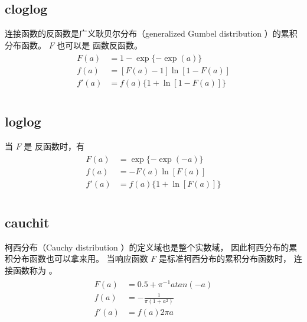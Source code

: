\documentclass[letterpaper,10pt,english]{sphinxmanual}
\begin{document}
\subsection{clog\sphinxhyphen{}log}
\label{\detokenize{_u6709_u5e8f_u79bb_u6563_u6a21_u578b/content:clog-log}}
 连接函数的反函数是广义耿贝尔分布（generalized Gumbel distribution ）的累积分布函数。
\(F\) 也可以是  函数反函数。
\begin{align}\label{equation:有序离散模型/content:有序离散模型/content:15}\!\begin{aligned}
F(a) &= 1 - \exp\{ -\exp(a) \}\\
f(a) &= [ F(a)-1] \ln [ 1- F(a)]\\
f'(a) &= f(a) \{ 1+\ln[1-F(a) ] \}\\
\end{aligned}\end{align}

\subsection{log\sphinxhyphen{}log}
\label{\detokenize{_u6709_u5e8f_u79bb_u6563_u6a21_u578b/content:log-log}}
当 \(F\) 是  反函数时，有
\begin{align}\label{equation:有序离散模型/content:有序离散模型/content:16}\!\begin{aligned}
F(a) &= \exp\{ -\exp(-a) \}\\
f(a) &= - F(a) \ln [ F(a)]\\
f'(a) &= f(a) \{ 1+\ln[F(a) ] \}\\
\end{aligned}\end{align}

\subsection{cauchit}
\label{\detokenize{_u6709_u5e8f_u79bb_u6563_u6a21_u578b/content:cauchit}}
柯西分布（Cauchy distribution ）的定义域也是整个实数域，
因此柯西分布的累积分布函数也可以拿来用。
当响应函数 \(F\) 是标准柯西分布的累积分布函数时，
连接函数称为 
。
\begin{align}\label{equation:有序离散模型/content:有序离散模型/content:17}\!\begin{aligned}
F(a) &=  0.5 + \pi^{-1} atan(-a)\\
f(a) &= -\frac{1}{\pi(1+a^2)}\\
f'(a) &= f(a) 2\pi a\\
\end{aligned}\end{align}
\end{document}

